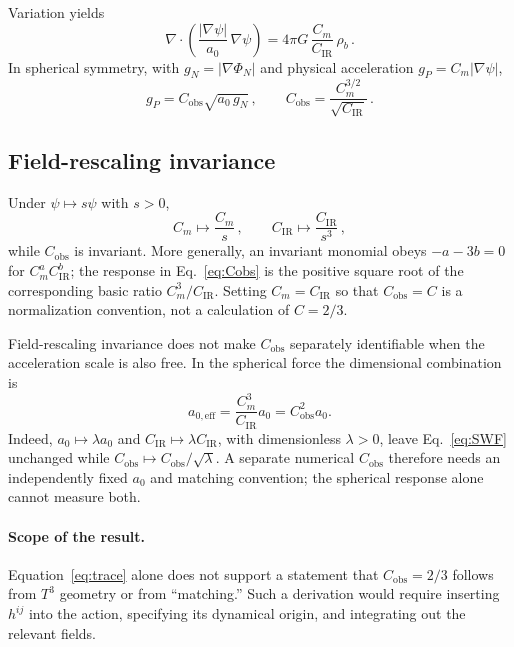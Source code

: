 \documentclass[aps,prd,reprint,superscriptaddress,nofootinbib,floatfix,showkeys]{revtex4-2}
\newcommand{\Tthree}{T^{3}}
\newcommand{\Cobs}{C_{\mathrm{obs}}}
\newcommand{\Cm}{C_{m}}
\newcommand{\CIR}{C_{\mathrm{IR}}}
\newcommand{\azero}{a_{0}}
\begin{document}
Variation yields
\begin{equation}
  \nabla\cdot\!\left(\frac{|\nabla\psi|}{\azero}\,\nabla\psi\right)
  = 4\pi G\,\frac{\Cm}{\CIR}\,\rho_{b}\,.
  \label{eq:p3}
\end{equation}
In spherical symmetry, with \(g_{N}=|\nabla\Phi_{N}|\) and physical
acceleration \(g_{P}=\Cm|\nabla\psi|\),
\begin{equation}
  g_{P} = \Cobs\sqrt{\azero\,g_{N}}\,,
  \qquad
  \boxed{
  \Cobs = \frac{\Cm^{3/2}}{\sqrt{\CIR}}
  }\,.
  \label{eq:Cobs}
\end{equation}

\subsection{Field-rescaling invariance}

Under \(\psi\mapsto s\psi\) with \(s>0\),
\begin{equation}
  \Cm\mapsto\frac{\Cm}{s}\,,
  \qquad
  \CIR\mapsto\frac{\CIR}{s^{3}}\,,
  \label{eq:rescale}
\end{equation}
while \(\Cobs\) is invariant.  More generally, an invariant monomial obeys
\(-a-3b=0\) for \(\Cm^a\CIR^b\); the response in
Eq.~\eqref{eq:Cobs} is the positive square root of the corresponding basic
ratio \(\Cm^3/\CIR\).  Setting \(\Cm=\CIR\) so that \(\Cobs=C\) is a
normalization convention, not a calculation of \(C=2/3\).

Field-rescaling invariance does not make \(\Cobs\) separately identifiable
when the acceleration scale is also free. In the spherical force the
dimensional combination is
\begin{equation}
 a_{0,\mathrm{eff}}=\frac{\Cm^3}{\CIR}\azero=\Cobs^2\azero.
 \label{eq:identifiable-scale}
\end{equation}
Indeed, \(\azero\mapsto\lambda\azero\) and
\(\CIR\mapsto\lambda\CIR\), with dimensionless \(\lambda>0\), leave
Eq.~\eqref{eq:SWF} unchanged while
\(\Cobs\mapsto\Cobs/\sqrt{\lambda}\). A separate numerical \(\Cobs\)
therefore needs an independently fixed \(\azero\) and matching convention;
the spherical response alone cannot measure both.

\paragraph{Scope of the result.}
Equation~\eqref{eq:trace} alone does not support a statement that
\(\Cobs=2/3\) follows from \(\Tthree\) geometry or from ``matching.''  Such a
derivation would require inserting \(h^{ij}\) into the action, specifying its
dynamical origin, and integrating out the relevant fields.
\end{document}

